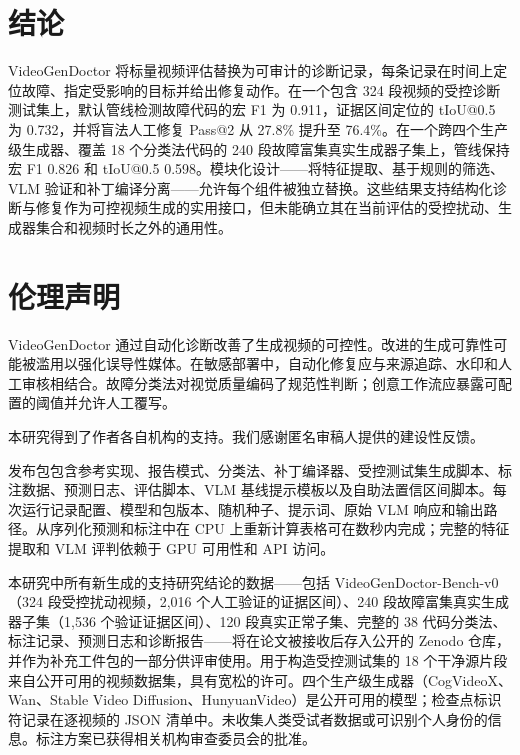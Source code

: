 \documentclass{article}
\begin{document}
\section{结论}
VideoGenDoctor 将标量视频评估替换为可审计的诊断记录，每条记录在时间上定位故障、指定受影响的目标并给出修复动作。在一个包含 324 段视频的受控诊断测试集上，默认管线检测故障代码的宏 F1 为 0.911，证据区间定位的 tIoU@0.5 为 0.732，并将盲法人工修复 Pass@2 从 27.8\% 提升至 76.4\%。在一个跨四个生产级生成器、覆盖 18 个分类法代码的 240 段故障富集真实生成器子集上，管线保持宏 F1 0.826 和 tIoU@0.5 0.598。模块化设计——将特征提取、基于规则的筛选、VLM 验证和补丁编译分离——允许每个组件被独立替换。这些结果支持结构化诊断与修复作为可控视频生成的实用接口，但未能确立其在当前评估的受控扰动、生成器集合和视频时长之外的通用性。

\section{伦理声明}
\label{sec:ethics}
VideoGenDoctor 通过自动化诊断改善了生成视频的可控性。改进的生成可靠性可能被滥用以强化误导性媒体。在敏感部署中，自动化修复应与来源追踪、水印和人工审核相结合。故障分类法对视觉质量编码了规范性判断；创意工作流应暴露可配置的阈值并允许人工覆写。

\begin{ack}
本研究得到了作者各自机构的支持。我们感谢匿名审稿人提供的建设性反馈。

发布包包含参考实现、报告模式、分类法、补丁编译器、受控测试集生成脚本、标注数据、预测日志、评估脚本、VLM 基线提示模板以及自助法置信区间脚本。每次运行记录配置、模型和包版本、随机种子、提示词、原始 VLM 响应和输出路径。从序列化预测和标注中在 CPU 上重新计算表格可在数秒内完成；完整的特征提取和 VLM 评判依赖于 GPU 可用性和 API 访问。

本研究中所有新生成的支持研究结论的数据——包括 VideoGenDoctor-Bench-v0（324 段受控扰动视频，2,016 个人工验证的证据区间）、240 段故障富集真实生成器子集（1,536 个验证证据区间）、120 段真实正常子集、完整的 38 代码分类法、标注记录、预测日志和诊断报告——将在论文被接收后存入公开的 Zenodo 仓库，并作为补充工件包的一部分供评审使用。用于构造受控测试集的 18 个干净源片段来自公开可用的视频数据集，具有宽松的许可。四个生产级生成器（CogVideoX、Wan、Stable Video Diffusion、HunyuanVideo）是公开可用的模型；检查点标识符记录在逐视频的 JSON 清单中。未收集人类受试者数据或可识别个人身份的信息。标注方案已获得相关机构审查委员会的批准。
\end{ack}

\FloatBarrier

{\small


}
\end{document}
